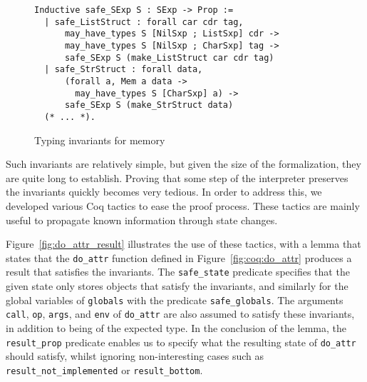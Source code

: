 \documentclass[
    sigplan,
    10pt,
    review, %
    natbib=false %
 ]{acmart}
\newcommand\et[1]{\todo[color=blue!20,size=\scriptsize]{#1}}
\begin{document}
\begin{figure}[t]
\begin{verbatim}
Inductive safe_SExp S : SExp -> Prop :=
  | safe_ListStruct : forall car cdr tag,
      may_have_types S [NilSxp ; ListSxp] cdr ->
      may_have_types S [NilSxp ; CharSxp] tag ->
      safe_SExp S (make_ListStruct car cdr tag)
  | safe_StrStruct : forall data,
      (forall a, Mem a data ->
        may_have_types S [CharSxp] a) ->
      safe_SExp S (make_StrStruct data)
  (* ... *).
\end{verbatim}
\vspace{-1em}
    \caption{Typing invariants for memory} %
    \label{fig:invariants:definition}
\end{figure}


Such invariants are relatively simple, but given the size of the formalization,
they are quite long to establish. Proving that some step of the interpreter preserves the invariants quickly becomes very tedious. In order to address this, we developed various Coq tactics to ease the proof process.
These tactics are mainly useful to propagate known information
through state changes.

Figure~\ref{fig:do_attr_result} illustrates the use of these tactics, with a lemma that states that the \texttt{do_attr} function
defined in Figure~\ref{fig:coq:do_attr} produces a result
that satisfies the invariants.
%
The \texttt{safe_state} predicate specifies
that the given state only stores objects that satisfy the invariants, and similarly
for the global variables of \texttt{globals} with the predicate \texttt{safe_globals}.
The arguments \texttt{call}, \texttt{op},
\texttt{args}, and \texttt{env} of \texttt{do_attr}
are also assumed to satisfy these invariants,
in addition to being of the expected type.
%
In the conclusion of the lemma, the \texttt{result_prop} predicate enables us
to specify what the resulting state of \texttt{do_attr} should satisfy,
whilst ignoring non-interesting cases
such as \texttt{result_not_implemented} or \texttt{result_bottom}.
\end{document}
